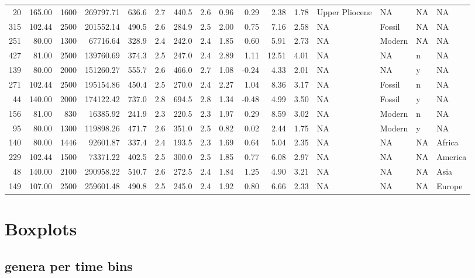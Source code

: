 \documentclass[]{article}
\begin{document}
\begin{longtable}[]{@{}rrrrrrrrrrrrllll@{}}
20 & 165.00 & 1600 & 269797.71 & 636.6 & 2.7 & 440.5 & 2.6 & 0.96 & 0.29
& 2.38 & 1.78 & Upper Pliocene & NA & NA & NA\tabularnewline
315 & 102.44 & 2500 & 201552.14 & 490.5 & 2.6 & 284.9 & 2.5 & 2.00 &
0.75 & 7.16 & 2.58 & NA & Fossil & NA & NA\tabularnewline
251 & 80.00 & 1300 & 67716.64 & 328.9 & 2.4 & 242.0 & 2.4 & 1.85 & 0.60
& 5.91 & 2.73 & NA & Modern & NA & NA\tabularnewline
427 & 81.00 & 2500 & 139760.69 & 374.3 & 2.5 & 247.0 & 2.4 & 2.89 & 1.11
& 12.51 & 4.01 & NA & NA & n & NA\tabularnewline
139 & 80.00 & 2000 & 151260.27 & 555.7 & 2.6 & 466.0 & 2.7 & 1.08 &
-0.24 & 4.33 & 2.01 & NA & NA & y & NA\tabularnewline
271 & 102.44 & 2500 & 195154.86 & 450.4 & 2.5 & 270.0 & 2.4 & 2.27 &
1.04 & 8.36 & 3.17 & NA & Fossil & n & NA\tabularnewline
44 & 140.00 & 2000 & 174122.42 & 737.0 & 2.8 & 694.5 & 2.8 & 1.34 &
-0.48 & 4.99 & 3.50 & NA & Fossil & y & NA\tabularnewline
156 & 81.00 & 830 & 16385.92 & 241.9 & 2.3 & 220.5 & 2.3 & 1.97 & 0.29 &
8.59 & 3.02 & NA & Modern & n & NA\tabularnewline
95 & 80.00 & 1300 & 119898.26 & 471.7 & 2.6 & 351.0 & 2.5 & 0.82 & 0.02
& 2.44 & 1.75 & NA & Modern & y & NA\tabularnewline
140 & 80.00 & 1446 & 92601.87 & 337.4 & 2.4 & 193.5 & 2.3 & 1.69 & 0.64
& 5.04 & 2.35 & NA & NA & NA & Africa\tabularnewline
229 & 102.44 & 1500 & 73371.22 & 402.5 & 2.5 & 300.0 & 2.5 & 1.85 & 0.77
& 6.08 & 2.97 & NA & NA & NA & America\tabularnewline
48 & 140.00 & 2100 & 290958.22 & 510.7 & 2.6 & 272.5 & 2.4 & 1.84 & 1.25
& 4.90 & 3.21 & NA & NA & NA & Asia\tabularnewline
149 & 107.00 & 2500 & 259601.48 & 490.8 & 2.5 & 245.0 & 2.4 & 1.92 &
0.80 & 6.66 & 2.33 & NA & NA & NA & Europe\tabularnewline
\bottomrule
\end{longtable}

\newpage

\section{Boxplots}\label{boxplots}

\subsection{genera per time bins}\label{genera-per-time-bins}
\end{document}
